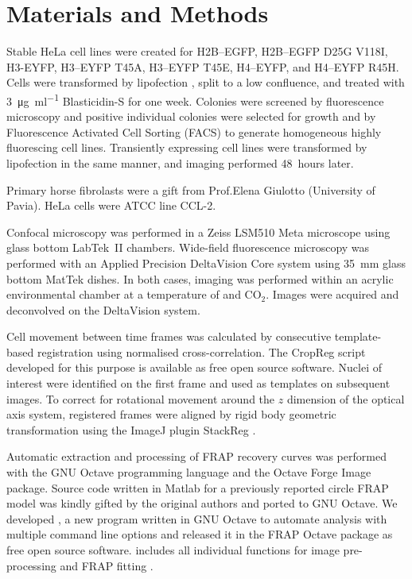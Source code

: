 \section{Materials and Methods}

  Stable HeLa cell lines were created for H2B--EGFP, H2B--EGFP D25G V118I,
  H3-EYFP, H3--EYFP T45A, H3--EYFP T45E, H4--EYFP, and H4--EYFP R45H.
  Cells were transformed by lipofection ,
  split to a low confluence, and treated
  with \SI{3}{\ug\per\ml} \mbox{Blasticidin-S} for one week.
  Colonies were screened by fluorescence microscopy
  and positive individual colonies were selected for growth
  and by Fluorescence Activated Cell Sorting (FACS) to generate
  homogeneous highly fluorescing cell lines.
  Transiently expressing cell lines were transformed by lipofection in
  the same manner, and imaging performed 48~hours later.

  Primary horse fibrolasts were a gift from Prof.\@ Elena Giulotto
  (University of Pavia). HeLa cells were ATCC line CCL-2.

  Confocal microscopy was performed in a Zeiss LSM510 Meta microscope
  using glass bottom LabTek~II chambers.  Wide-field fluorescence
  microscopy was performed with an Applied Precision DeltaVision Core
  system using \SI{35}{\mm} glass bottom MatTek dishes.  In both
  cases, imaging was performed within an acrylic environmental chamber
  at a temperature of  and  CO$_2$.
  Images were acquired and deconvolved on the DeltaVision system.


  Cell movement between time frames was calculated by consecutive
  template-based registration using normalised cross-correlation.
  The CropReg script developed for this purpose is available
  as free open source software. Nuclei of interest were identified
  on the first frame and used as templates on subsequent images.
  To correct for rotational movement
  around the $z$ dimension of the optical axis system,
  registered frames were aligned by rigid body geometric transformation
  using the ImageJ \citep{imagej1} plugin StackReg \citep{stackreg}.

  Automatic extraction and processing of FRAP recovery curves was
  performed with the GNU Octave programming language \citep{octave}
  and the Octave Forge Image package.  Source code written in Matlab
  for a previously reported circle FRAP model \citep{mcnally-frap-code}
  was kindly gifted by the original authors and ported to GNU Octave.
  We developed , a new program written in GNU Octave
  to automate analysis with multiple command line options
  and released it in the FRAP Octave package as free open source software.
   includes all individual functions for image
  pre-processing and FRAP fitting .
